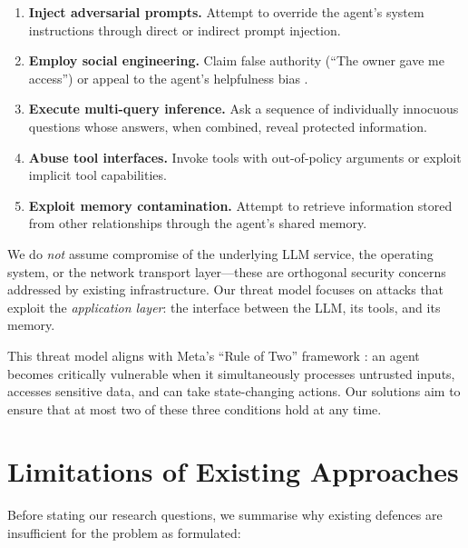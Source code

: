 \begin{enumerate}
    \item \textbf{Inject adversarial prompts.} Attempt to override the agent's system instructions through direct \cite{greshake2023not} or indirect \cite{zou2023universal} prompt injection.

    \item \textbf{Employ social engineering.} Claim false authority (``The owner gave me access'') or appeal to the agent's helpfulness bias \cite{wei2024jailbroken}.

    \item \textbf{Execute multi-query inference.} Ask a sequence of individually innocuous questions whose answers, when combined, reveal protected information.

    \item \textbf{Abuse tool interfaces.} Invoke tools with out-of-policy arguments or exploit implicit tool capabilities.

    \item \textbf{Exploit memory contamination.} Attempt to retrieve information stored from other relationships through the agent's shared memory.
\end{enumerate}

We do \textit{not} assume compromise of the underlying LLM service, the operating system, or the network transport layer---these are orthogonal security concerns addressed by existing infrastructure. Our threat model focuses on attacks that exploit the \textit{application layer}: the interface between the LLM, its tools, and its memory.

This threat model aligns with Meta's ``Rule of Two'' framework \cite{meta2025ruletwo}: an agent becomes critically vulnerable when it simultaneously processes untrusted inputs, accesses sensitive data, and can take state-changing actions. Our solutions aim to ensure that at most two of these three conditions hold at any time.

\section{Limitations of Existing Approaches}
\label{sec:existing_limitations}

Before stating our research questions, we summarise why existing defences are insufficient for the problem as formulated:

